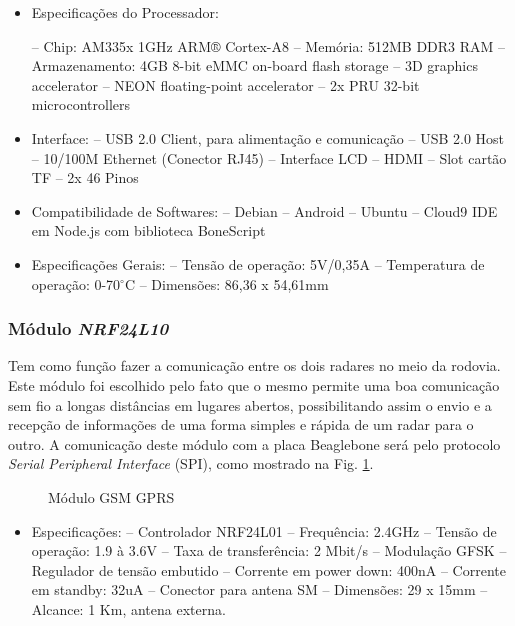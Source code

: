 \begin{itemize}

\item Especificações do Processador:

– Chip: AM335x 1GHz ARM® Cortex-A8
– Memória: 512MB DDR3 RAM
– Armazenamento: 4GB 8-bit eMMC on-board flash storage
– 3D graphics accelerator
– NEON floating-point accelerator
– 2x PRU 32-bit microcontrollers

\item Interface:
– USB 2.0 Client, para alimentação e comunicação
– USB 2.0 Host
– 10/100M Ethernet (Conector RJ45)
– Interface LCD
– HDMI
– Slot cartão TF
– 2x 46 Pinos

\item  Compatibilidade de Softwares:
– Debian
– Android
– Ubuntu
– Cloud9 IDE em Node.js com biblioteca BoneScript

\item  Especificações Gerais:
– Tensão de operação: 5V/0,35A
– Temperatura de operação: 0-70$^{\circ}$C
– Dimensões: 86,36 x 54,61mm
    
\end{itemize}
 \subsubsection{Módulo \emph{NRF24L10}} 

Tem como função fazer a comunicação entre os dois radares no meio da rodovia. Este módulo foi escolhido pelo fato que o mesmo permite uma boa comunicação sem fio a longas distâncias em lugares abertos, possibilitando assim o envio e a recepção de informações de uma forma simples e rápida de um radar para o outro. A comunicação deste módulo com a placa Beaglebone será pelo protocolo \emph{Serial Peripheral Interface} (SPI), como mostrado na Fig. \ref{fig:nrf24}. 

\begin{figure}[!htb]
	\caption{\label{fig:nrf24} Módulo GSM  GPRS}
\end{figure}
\begin{itemize}
    
\item  Especificações:
– Controlador NRF24L01
– Frequência: 2.4GHz
– Tensão de operação: 1.9 à 3.6V
– Taxa de transferência: 2 Mbit/s
– Modulação GFSK
– Regulador de tensão embutido
– Corrente em power down: 400nA
– Corrente em standby: 32uA
– Conector para antena SM
– Dimensões: 29 x 15mm
– Alcance: 1 Km, antena externa.
\end{itemize}

